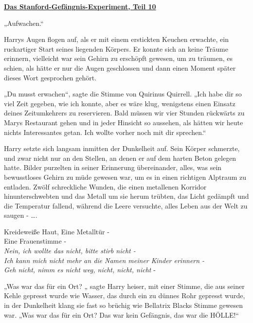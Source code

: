 

\hypertarget{das-stanford-gefuxe4ngnis-experiment-teil-10}{%

\textbf{\uline{Das Stanford-Gefängnis-Experiment, Teil 10}}

\hfill\break „Aufwachen.“

Harrys Augen flogen auf, als er mit einem erstickten Keuchen erwachte, ein ruckartiger Start seines liegenden Körpers. Er konnte sich an keine Träume erinnern, vielleicht war sein Gehirn zu erschöpft gewesen, um zu träumen, es schien, als hätte er nur die Augen geschlossen und dann einen Moment später dieses Wort gesprochen gehört.

„Du musst erwachen“, sagte die Stimme von Quirinus Quirrell. „Ich habe dir so viel Zeit gegeben, wie ich konnte, aber es wäre klug, wenigstens einen Einsatz deines Zeitumkehrers zu reservieren. Bald müssen wir vier Stunden rückwärts zu Marys Restaurant gehen und in jeder Hinsicht so aussehen, als hätten wir heute nichts Interessantes getan. Ich wollte vorher noch mit dir sprechen.“

Harry setzte sich langsam inmitten der Dunkelheit auf. Sein Körper schmerzte, und zwar nicht nur an den Stellen, an denen er auf dem harten Beton gelegen hatte. Bilder purzelten in seiner Erinnerung übereinander, alles, was sein bewusstloses Gehirn zu müde gewesen war, um es in einen richtigen Alptraum zu entladen. Zwölf schreckliche Wunden, die einen metallenen Korridor hinunterschwebten und das Metall um sie herum trübten, das Licht gedämpft und die Temperatur fallend, während die Leere versuchte, alles Leben aus der Welt zu saugen - ….

Kreideweiße Haut, Eine Metalltür -\\ Eine Frauenstimme -\\ \emph{Nein, ich wollte das nicht, bitte stirb nicht -\\ Ich kann mich nicht mehr an die Namen meiner Kinder erinnern -\\ Geh nicht, nimm es nicht weg, nicht, nicht, nicht} -

„Was war das für ein Ort? „ sagte Harry heiser, mit einer Stimme, die aus seiner Kehle gepresst wurde wie Wasser, das durch ein zu dünnes Rohr gepresst wurde, in der Dunkelheit klang sie fast so brüchig wie Bellatrix Blacks Stimme gewesen war. „Was war das für ein Ort? Das war kein Gefängnis, das war die HÖLLE!“

}
